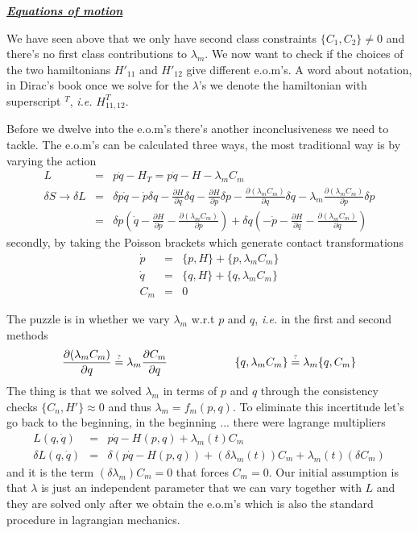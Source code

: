 \documentclass[aps,preprint,preprintnumbers,nofootinbib,showpacs,prd]{revtex4-1}
\newcommand{\ie}{{\it i.e.} }
\newcommand{\nbea}{\begin{eqnarray*}}
\newcommand{\neea}{\end{eqnarray*}}
\begin{document}
\bigskip
\underline{\textbf{\textit{Equations of motion}}}

We have seen above that we only have second class constraints $\{C_1, C_2\} \neq 0$ and there's no first class contributions to $\lambda_m$. We now want to check if the choices of the two hamiltonians $H'_{11}$ and $H'_{12}$ give different e.o.m's. A word about notation, in Dirac's book once we solve for the $\lambda$'s we denote the hamiltonian with superscript $^T$, \ie $H^T_{11,12}$.

Before we dwelve into the e.o.m's there's another inconclusiveness we need to tackle. The e.o.m's can be calculated three ways, the most traditional way is by varying the action
%
\nbea
L & = & p\dot q - H_T = p\dot q - H - \lambda_m C_m \\
\delta S \to \delta L & = & \delta p \dot q - \dot p \delta q - \frac{\partial H}{\partial q} \delta q - \frac{\partial H}{\partial p}\delta p - \frac{\partial (\lambda_m C_m)}{\partial q}\delta q - \lambda_m \frac{\partial (\lambda_m C_m)}{\partial p}\delta p \\
& = & \delta p \left ( \dot q  - \frac{\partial H}{\partial p} - \frac{\partial (\lambda_m C_m)}{\partial p} \right ) + \delta q \left ( - \dot p - \frac{\partial H}{\partial q} - \frac{\partial (\lambda_m C_m)}{\partial q}\right )
\neea
%
secondly, by taking the Poisson brackets which generate contact transformations
%
\nbea
\dot p & = & \{p, H\} + \{p, \lambda_m C_m\} \\
\dot q & = & \{q, H\} + \{q, \lambda_m C_m\} \\
C_m & = & 0
\neea
%

The puzzle is in whether we vary $\lambda_m$ w.r.t $p$ and $q$, \ie in the first and second methods
%
\nbea
\frac{\partial (\lambda_m C_m)}{\partial q} \stackrel{\text{\tiny ?}}{=} \lambda_m\frac{\partial C_m}{\partial q} &~~~~~~~~~~~~~~~& \{q, \lambda_m C_m\} \stackrel{\text{\tiny ?}}{=} \lambda_m \{q, C_m\}
\neea
%
The thing is that we solved $\lambda_m$ in terms of $p$ and $q$ through the consistency checks $\{C_n, H'\} \approx 0$ and thus $\lambda_m = f_m(p,q)$. To eliminate this incertitude let's go back to the beginning, in the beginning ... there were lagrange multipliers
%
\nbea
L(q,\dot q) & = & p\dot q - H(p,q) + \lambda_m(t) C_m \\
\delta L(q,\dot q) & = & \delta(p\dot q - H(p,q)) + (\delta\lambda_m(t)) C_m + \lambda_m(t) (\delta C_m)
\neea
%
and it is the term $(\delta\lambda_m) C_m = 0$ that forces $C_m = 0$. Our initial assumption is that $\lambda$ is just an independent parameter that we can vary together with $L$ and they are solved only after we obtain the e.o.m's which is also the standard procedure in lagrangian mechanics. 
\end{document}
